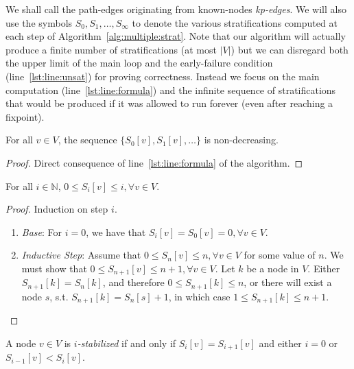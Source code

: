 \label{correctness}

We shall call the path-edges originating from known-nodes
\emph{\emph{kp}-edges}.  We will also use the symbols $S_0,
S_1,\ldots,S_\infty$ to denote the various stratifications computed at
each step of Algorithm~\ref{alg:multiple:strat}.  Note that our
algorithm will actually produce a finite number of stratifications (at
most $|V|$) but we can disregard both the upper limit of the main loop
and the early-failure condition (line~\ref{lst:line:unsat}) for
proving correctness. Instead we focus on the main computation
(line~\ref{lst:line:formula}) and the infinite sequence of
stratifications that would be produced if it was allowed to run
forever (even after reaching a fixpoint).

\begin{lem}\label{monotonicity}
  For all $v \in V$, the sequence $\{ S_{0}[v], S_{1}[v], \ldots \}$
  is non-decreasing.
\end{lem}
\begin{proof}
  Direct consequence of line~\ref{lst:line:formula} of the algorithm.
\end{proof}

\begin{lem}\label{range}
  For all $i \in \mathbb{N}$, $0 \leq S_i[v] \leq i, \forall v \in V$.
\end{lem}

\begin{proof}
  Induction on step $i$.

  \begin{enumerate}
  \item \emph{Base}: For $i = 0$, we have that $S_i[v] = S_0[v] = 0, \forall v
    \in V$.
  \item \emph{Inductive Step}: Assume that $0 \leq S_n[v] \leq n,
    \forall v \in V$ for some value of $n$. We must show that $0 \leq
    S_{n+1}[v] \leq n + 1, \forall v \in V$. Let $k$ be a node in $V$.
    Either $S_{n+1}[k] = S_{n}[k]$, and therefore $0 \leq S_{n+1}[k] \leq
    n$, or there will exist a node $s$, s.t. $S_{n+1}[k] = S_{n}[s] +
    1$, in which case $1 \leq S_{n+1}[k] \leq n + 1$.
  \end{enumerate}
\end{proof}

\begin{defn}
  A node $v \in V$ is \emph{$i$-stabilized} if and only if $S_i[v] =
  S_{i+1}[v]$ and either $i = 0$ or $S_{i-1}[v] < S_i[v]$.
\end{defn}

